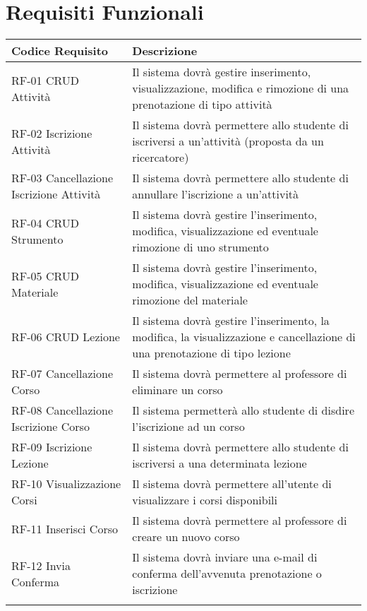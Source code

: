 \documentclass[11pt,a4paper]{report}
\begin{document}
\section{Requisiti Funzionali}
\begin{longtable}{>{\raggedright\arraybackslash}p{5cm} >{\raggedright\arraybackslash}p{10cm}}
\toprule
\rowcolor{headergray}
\textbf{Codice Requisito} & \textbf{Descrizione} \\
\midrule
\rowcolor{white}
RF-01 CRUD Attività & Il sistema dovrà gestire inserimento, visualizzazione, modifica e rimozione di una prenotazione di tipo attività \\
\rowcolor{rowgray}
RF-02 Iscrizione Attività & Il sistema dovrà permettere allo studente di iscriversi a un'attività (proposta da un ricercatore) \\
\rowcolor{white}
RF-03 Cancellazione Iscrizione Attività & Il sistema dovrà permettere allo studente di annullare l'iscrizione a un'attività \\
\rowcolor{rowgray}
RF-04 CRUD Strumento & Il sistema dovrà gestire l’inserimento, modifica, visualizzazione ed eventuale rimozione di uno strumento \\
\rowcolor{white}
RF-05 CRUD Materiale & Il sistema dovrà gestire l’inserimento, modifica, visualizzazione ed eventuale rimozione del materiale \\
\rowcolor{rowgray}
RF-06 CRUD Lezione & Il sistema dovrà gestire l’inserimento, la modifica, la visualizzazione e cancellazione di una prenotazione di tipo lezione \\
\rowcolor{white}
RF-07 Cancellazione Corso & Il sistema dovrà permettere al professore di eliminare un corso \\
\rowcolor{rowgray}
RF-08 Cancellazione Iscrizione Corso & Il sistema permetterà allo studente di disdire l'iscrizione ad un corso \\
\rowcolor{white}
RF-09 Iscrizione Lezione & Il sistema dovrà permettere allo studente di iscriversi a una determinata lezione \\
\rowcolor{rowgray}
RF-10 Visualizzazione Corsi & Il sistema dovrà permettere all'utente di visualizzare i corsi disponibili \\
\rowcolor{white}
RF-11 Inserisci Corso & Il sistema dovrà permettere al professore di creare un nuovo corso \\
\rowcolor{rowgray}
RF-12 Invia Conferma & Il sistema dovrà inviare una e-mail di conferma dell'avvenuta prenotazione o iscrizione \\
\rowcolor{white}

\end{longtable}
\end{document}
